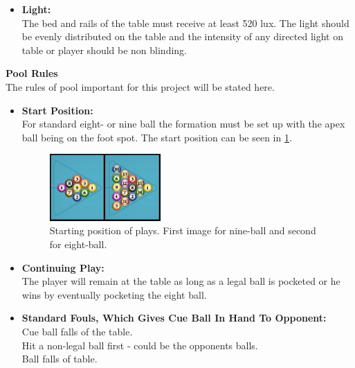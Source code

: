 \begin{itemize}
		
	\item \textbf{Light:}\\
		The bed and rails of the table must receive at least 520 lux. The light should be evenly distributed on the table and the intensity of any directed light on table or player should be non blinding.
\end{itemize}

\textbf{Pool Rules}\\
The rules of pool important for this project will be stated here.

\begin{itemize}
	\item \textbf{Start Position:}\\
		For standard eight- or nine ball the formation must be set up with the apex ball being on the foot spot. The start position can be seen in \ref{fig:poolstart}.\\
		
\begin{figure}[H]
\begin{center}
\leavevmode
\includegraphics[width=0.4\textwidth]{images/poolstart.jpg}
\end{center}
\caption{Starting position of plays. First image for nine-ball and second for eight-ball.}
\label{fig:poolstart}
\end{figure}

	\item \textbf{Continuing Play:}\\
		The player will remain at the table as long as a legal ball is pocketed or he wins by eventually pocketing the eight ball.\\
		
	\item \textbf{Standard Fouls, Which Gives Cue Ball In Hand To Opponent:}\\
		Cue ball falls of the table.\\
		Hit a non-legal ball first - could be the opponents balls.\\
		Ball falls of table.\\
		

\end{itemize}
